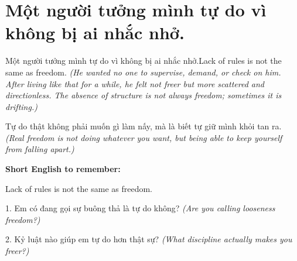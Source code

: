 \section{Một người tưởng mình tự do vì không bị ai nhắc nhở.}
\begin{truyen}{Một người tưởng mình tự do vì không bị ai nhắc nhở.}{Lack of rules is not the same as freedom.}
\textit{(He wanted no one to supervise, demand, or check on him. After living like that for a while, he felt not freer but more scattered and directionless. The absence of structure is not always freedom; sometimes it is drifting.)}
\end{truyen}
\begin{baihoc}
Tự do thật không phải muốn gì làm nấy, mà là biết tự giữ mình khỏi tan ra.
\textit{(Real freedom is not doing whatever you want, but being able to keep yourself from falling apart.)}
\end{baihoc}
\begin{ghinhoanh}
\textbf{Short English to remember:}

Lack of rules is not the same as freedom.
\end{ghinhoanh}
\begin{tuhocnhanh}
1. Em có đang gọi sự buông thả là tự do không? \textit{(Are you calling looseness freedom?)}

2. Kỷ luật nào giúp em tự do hơn thật sự? \textit{(What discipline actually makes you freer?)}
\end{tuhocnhanh}
\ngancach

